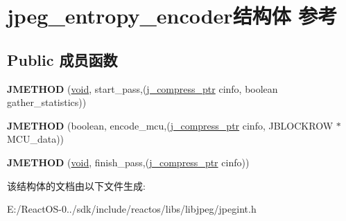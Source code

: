 \hypertarget{structjpeg__entropy__encoder}{}\section{jpeg\+\_\+entropy\+\_\+encoder结构体 参考}
\label{structjpeg__entropy__encoder}
\subsection*{Public 成员函数}
\begin{DoxyCompactItemize}
\item 
\mbox{\label{structjpeg__entropy__encoder_aa42cc97f950746e53857b958e00519dd}} 
{\bfseries J\+M\+E\+T\+H\+OD} (\hyperlink{interfacevoid}{void}, start\+\_\+pass,(\hyperlink{structjpeg__compress__struct}{j\+\_\+compress\+\_\+ptr} cinfo, boolean gather\+\_\+statistics))
\item 
\mbox{\label{structjpeg__entropy__encoder_a6852c01b9a63cceaae5f1d0e4ef1185a}} 
{\bfseries J\+M\+E\+T\+H\+OD} (boolean, encode\+\_\+mcu,(\hyperlink{structjpeg__compress__struct}{j\+\_\+compress\+\_\+ptr} cinfo, J\+B\+L\+O\+C\+K\+R\+OW $\ast$M\+C\+U\+\_\+data))
\item 
\mbox{\label{structjpeg__entropy__encoder_a349e641fd2289448e8169b8aa8edefa5}} 
{\bfseries J\+M\+E\+T\+H\+OD} (\hyperlink{interfacevoid}{void}, finish\+\_\+pass,(\hyperlink{structjpeg__compress__struct}{j\+\_\+compress\+\_\+ptr} cinfo))
\end{DoxyCompactItemize}


该结构体的文档由以下文件生成\+:\begin{DoxyCompactItemize}
\item 
E\+:/\+React\+O\+S-\/0../sdk/include/reactos/libs/libjpeg/jpegint.\+h\end{DoxyCompactItemize}
